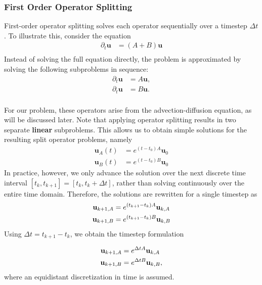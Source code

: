 \subsubsection{First Order Operator Splitting}

First-order operator splitting solves each operator sequentially over a 
timestep $\Delta t$. To illustrate this, consider the equation 
\begin{align}
    \partial_t  \bm{u} &= (A+B)\bm{u} \\
\end{align}
Instead of solving the full equation directly, the problem is approximated
by solving the following subproblems in sequence:
\begin{align}
    \partial_t \bm{u} &= A\bm{u}, \\
    \partial_t \bm{u} &= B\bm{u}. \\
\end{align}

For our problem, these operators arise from the advection-diffusion 
equation, as will be discussed later. Note that applying operator 
splitting results in two separate \textbf{linear} subproblems. This allows
us to obtain simple solutions for the resulting split operator problems,
namely
\begin{align}
    \bm u_A(t) &= e^{(t-t_0) A}\bm u_0 \\
    \bm u_B(t) &= e^{(t-t_0) B}\bm u_0 
\end{align}
In practice, however, we only advance the solution over the next discrete
time interval $[t_k, t_{k+1}]=[t_k, t_k + \Delta t]$, rather than solving
continuously over the entire time domain. Therefore, the solutions are
rewritten for a single timestep as
\begin{align}
    \textbf u_{k+1, A} &= e^{(t_{k+1} - t_k) A}\textbf u_{k, A} \\
    \textbf u_{k+1, B} &= e^{(t_{k+1} - t_k) B}\textbf u_{k, B} 
\end{align}
Using $\Delta t = t_{k+1}-t_k$, we obtain the timestep formulation

\begin{align}
    \textbf u_{k+1, A} &= e^{\Delta t A}\textbf u_{k, A} \\
    \textbf u_{k+1, B} &= e^{\Delta t B}\textbf u_{k, B},
\end{align}
where an equidistant discretization in time is assumed. 

